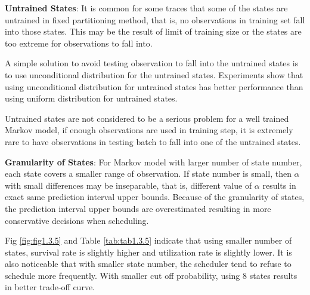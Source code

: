 \documentclass{article}
\begin{document}
\begin{flushleft}
\textbf{Untrained States}: It is common for some traces that some of the states are untrained in fixed partitioning method, that is, no observations in training set fall into those states. This may be the result of limit of training size or the states are too extreme for observations to fall into. 

A simple solution to avoid testing observation to fall into the untrained states is to use unconditional distribution for the untrained states. Experiments show that using unconditional distribution for untrained states has better performance than using uniform distribution for untrained states.

Untrained states are not considered to be a serious problem for a well trained Markov model, if enough observations are used in training step, it is extremely rare to have observations in testing batch to fall into one of the untrained states.
\end{flushleft}

\begin{flushleft}
\textbf{Granularity of States}: For Markov model with larger number of state number, each state covers a smaller range of observation. If state number is small, then $\alpha$ with small differences may be inseparable, that is, different value of $\alpha$ results in exact same prediction interval upper bounds. Because of the granularity of states, the prediction interval upper bounds are overestimated resulting in more conservative decisions when scheduling.

Fig \ref{fig:fig1.3.5} and Table \ref{tab:tab1.3.5} indicate that using smaller number of states, survival rate is slightly higher and utilization rate is slightly lower. It is also noticeable that with smaller state number, the scheduler tend to refuse to schedule more frequently. With smaller cut off probability, using $8$ states results in better trade-off curve.
\end{flushleft}
\end{document}
